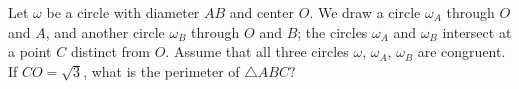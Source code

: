 Let $\omega$ be a circle with diameter $AB$ and center $O$. We draw a circle $\omega_A$ through $O$ and $A$, and another circle $\omega_B$ through $O$ and $B$; the circles $\omega_A$ and $\omega_B$ intersect at a point $C$ distinct from $O$. Assume that all three circles $\omega$, $\omega_A$, $\omega_B$ are congruent. If $CO = \sqrt 3$, what is the perimeter of $\triangle ABC$?
